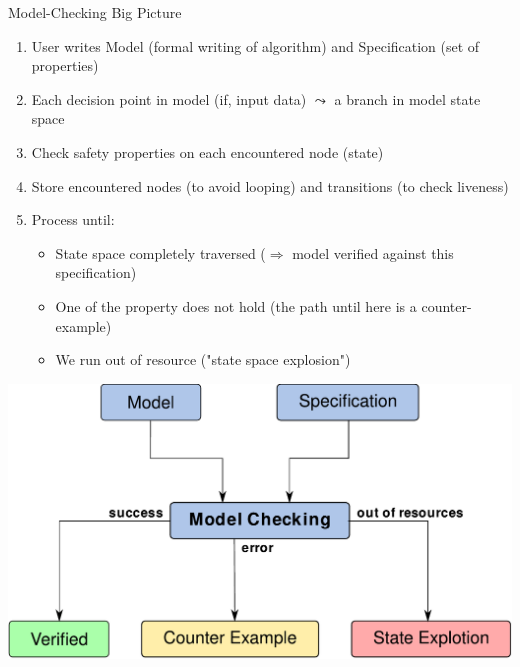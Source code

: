 \begin{frame}{Model-Checking Big Picture}
  \begin{enumerate}
  \item User writes \alert{Model} {\small(formal writing of algorithm)} and
    \alert{Specification} {\small(set of properties)}
  \item Each decision point in model (if, input data) $\leadsto$ a branch
    in model state space
  \item Check safety properties on each encountered node (state)
  \item Store encountered nodes (to avoid looping) and transitions (to check liveness)
  \item Process until:
    \begin{itemize}
    \item State space completely traversed ($\Rightarrow$ model verified
      against this specification)
    \item One of the property does not hold (the path until here is a
      counter-example)
    \item We run out of resource ("state space explosion")
    \end{itemize}
  \end{enumerate}

  \centerline{\includegraphics[width=.56\linewidth]{fig/test_modelchecking.pdf}}
\end{frame}
